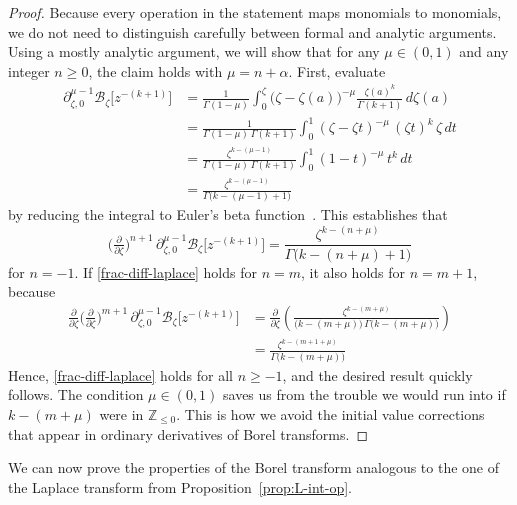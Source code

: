 \documentclass{article}
\newcommand{\Z}{\mathbb{Z}}
\newcommand{\borel}{\mathcal{B}}
\theoremstyle{definition}
\theoremstyle{plain}
\begin{document}
\begin{proof}
Because every operation in the statement maps monomials to monomials, we do not need to distinguish carefully between formal and analytic arguments. Using a mostly analytic argument, we will show that for any $\mu \in (0, 1)$ and any integer $n \ge 0$, the claim holds with $\mu = n + \alpha$. First, evaluate
\begin{align*}
\partial^{\mu-1}_{\zeta,0} \borel_\zeta \big[z^{-(k+1)}\big] & = \frac{1}{\Gamma(1-\mu)} \int_0^\zeta \big(\zeta-\zeta(a)\big)^{-\mu} \frac{\zeta(a)^k}{\Gamma(k+1)}\,d\zeta(a) \\
& = \frac{1}{\Gamma(1-\mu)\,\Gamma(k+1)} \int_0^1 (\zeta-\zeta t)^{-\mu}\,(\zeta t)^k\,\zeta\,dt \\
& = \frac{\zeta^{k-(\mu-1)}}{\Gamma(1-\mu)\,\Gamma(k+1)} \int_0^1 (1-t)^{-\mu}\,t^k\,dt \\
& = \frac{\zeta^{k-(\mu-1)}}{\Gamma\big(k-(\mu-1)+1\big)}
\end{align*}
by reducing the integral to Euler's beta function~\cite[identity 5.12.1]{dlmf}. This establishes that
\begin{equation}\label{frac-diff-laplace}
\big(\tfrac{\partial}{\partial \zeta}\big)^{n+1}\,\partial^{\mu-1}_{\zeta,0} \borel_\zeta \big[z^{-(k+1)}\big] = \frac{\zeta^{k-(n+\mu)}}{\Gamma\big(k-(n+\mu)+1\big)}
\end{equation}
for $n = -1$. If \eqref{frac-diff-laplace} holds for $n = m$, it also holds for $n = m+1$, because
\begin{align*}
\tfrac{\partial}{\partial \zeta} \big(\tfrac{\partial}{\partial \zeta}\big)^{m+1}\,\partial^{\mu-1}_{\zeta,0} \borel_\zeta \big[z^{-(k+1)}\big] & = \frac{\partial}{\partial \zeta} \left( \frac{\zeta^{k-(m+\mu)}}{\big(k-(m+\mu)\big)\,\Gamma\big(k-(m+\mu)\big)} \right) \\
& = \frac{\zeta^{k-(m+1+\mu)}}{\Gamma\big(k-(m+\mu)\big)}
\end{align*}
Hence, \eqref{frac-diff-laplace} holds for all $n \ge -1$, and the desired result quickly follows. The condition $\mu \in (0, 1)$ saves us from the trouble we would run into if $k-(m+\mu)$ were in $\Z_{\le 0}$. This is how we avoid the initial value corrections that appear in ordinary derivatives of Borel transforms.
\end{proof}
We can now prove the properties of the Borel transform analogous to the one of the Laplace transform from Proposition~\ref{prop:L-int-op}.
\end{document}
